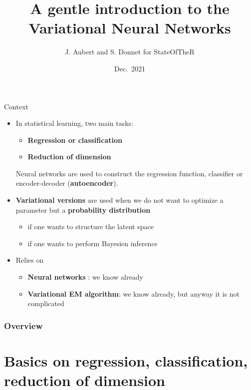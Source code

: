 \documentclass[compress,10pt]{beamer}
\title{A gentle introduction to the Variational Neural Networks}
\author{J. Aubert and S. Donnet for StateOfTheR}
\date{Dec.~2021}
\begin{document}
\frame{\titlepage}



\begin{frame}{Context}

\begin{itemize}
\item  In statistical learning, two main tasks:
\begin{itemize}
 
\item   \textbf{Regression or classification}
\item   \textbf{Reduction of dimension}
 
\end{itemize}
  Neural networks are used to construct the regression function,
  classifier or encoder-decoder (\textbf{autoencoder}).
\item
  \textbf{Variational versions} are used when we do not want to optimize
  a parameter but a \textbf{probability distribution}
\begin{itemize}
  \item
  if one wants to structure the latent space
\item
  if one wants to perform Bayesien inference
  \end{itemize}
  
\item
  Relies on
  \begin{itemize}
\item
  \textbf{Neural networks} : we know already
\item
  \textbf{Variational EM algorithm}: we know already, but anyway it is
  not complicated
   \end{itemize}
\end{itemize}
\end{frame}


\begin{frame}
\frametitle{Overview} 
\tableofcontents
\end{frame}



\section{Basics on regression, classification, reduction of dimension}
\end{document}
